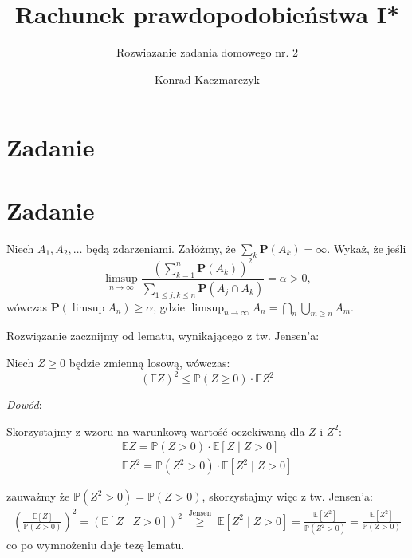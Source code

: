 \documentclass[11pt]{scrartcl}
\author{Konrad Kaczmarczyk}
\begin{document}
    \title{Rachunek prawdopodobieństwa I*}
    \subtitle{Rozwiazanie zadania domowego nr. 2}
    \maketitle

    \section{Zadanie}

    \section{Zadanie}

    \begin{zadanie*}
        Niech \( A_1, A_2, \dots \) będą zdarzeniami. 
        Załóżmy, że \( \sum_k \mathbf{P}(A_k) = \infty \). Wykaż, że jeśli
        \[
            \limsup_{n \to \infty} 
                \frac{\left( \sum_{k=1}^{n} \mathbf{P}(A_k) \right)^2}
                {\sum_{1 \leq j, k \leq n} \mathbf{P}(A_j \cap A_k)} 
                = \alpha > 0,
        \]
        wówczas \( \mathbf{P} (\limsup A_n) \geq \alpha \), 
        gdzie \( \limsup_{n \to \infty} A_n = \bigcap_n \bigcup_{m \geq n} A_m \).
    \end{zadanie*}

    Rozwiązanie zacznijmy od lematu, wynikającego z tw. Jensen'a:
    \begin{lemat}
        \label{lem:cauchy}
        Niech $Z \geq 0$ będzie zmienną losową, wówczas:
        \[
            \left ( \mathbb{E} Z \right )^2 \leq \mathbb{P} (Z \geq 0) \cdot \mathbb{E} Z^2 
        \]
    \end{lemat}

    \textit{Dowód}:

    Skorzystajmy z wzoru na warunkową wartość oczekiwaną dla $Z$ i $Z^2$:
    \begin{gather*}
        \mathbb{E} Z = \mathbb{P} (Z > 0) \cdot \mathbb{E} \left [ Z \mid Z > 0 \right ] \\
        \mathbb{E} Z^2 = \mathbb{P} (Z^2 > 0) \cdot \mathbb{E} \left [ Z^2 \mid Z > 0 \right ] 
    \end{gather*}

    zauważmy że $ \mathbb{P} (Z^2 > 0) = \mathbb{P} (Z > 0) $, skorzystajmy więc z tw. Jensen'a:
    \begin{gather*}
        \left ( \frac{\mathbb{E} [Z]}{\mathbb{P} (Z > 0)} \right )^2 = 
        \left ( \mathbb{E} \left [ Z \mid Z > 0 \right ] \right )^2 
        \; \stackrel{\text{Jensen}}{\geq} \;
        \mathbb{E} \left [ Z^2 \mid Z > 0 \right ] =
        \frac{\mathbb{E} [Z^2]}{\mathbb{P} (Z^2 > 0)} =
        \frac{\mathbb{E} [Z^2]}{\mathbb{P} (Z > 0)}
    \end{gather*}
    co po wymnożeniu daje tezę lematu.
\end{document}
